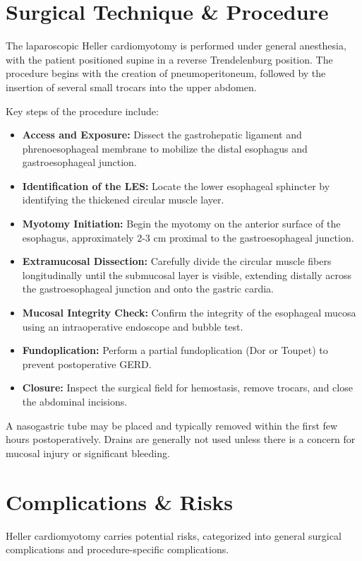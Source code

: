 \section*{Surgical Technique \& Procedure}
The laparoscopic Heller cardiomyotomy is performed under general anesthesia, with the patient positioned supine in a reverse Trendelenburg position. The procedure begins with the creation of pneumoperitoneum, followed by the insertion of several small trocars into the upper abdomen.

Key steps of the procedure include:

\begin{itemize}
  \item \textbf{Access and Exposure:} Dissect the gastrohepatic ligament and phrenoesophageal membrane to mobilize the distal esophagus and gastroesophageal junction.
  \item \textbf{Identification of the LES:} Locate the lower esophageal sphincter by identifying the thickened circular muscle layer.
  \item \textbf{Myotomy Initiation:} Begin the myotomy on the anterior surface of the esophagus, approximately 2-3 cm proximal to the gastroesophageal junction.
  \item \textbf{Extramucosal Dissection:} Carefully divide the circular muscle fibers longitudinally until the submucosal layer is visible, extending distally across the gastroesophageal junction and onto the gastric cardia.
  \item \textbf{Mucosal Integrity Check:} Confirm the integrity of the esophageal mucosa using an intraoperative endoscope and bubble test.
  \item \textbf{Fundoplication:} Perform a partial fundoplication (Dor or Toupet) to prevent postoperative GERD.
  \item \textbf{Closure:} Inspect the surgical field for hemostasis, remove trocars, and close the abdominal incisions.
\end{itemize}

A nasogastric tube may be placed and typically removed within the first few hours postoperatively. Drains are generally not used unless there is a concern for mucosal injury or significant bleeding.

\section*{Complications \& Risks}
Heller cardiomyotomy carries potential risks, categorized into general surgical complications and procedure-specific complications.

